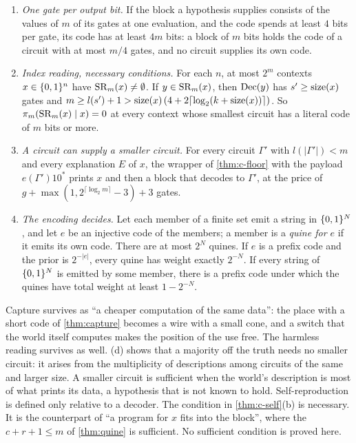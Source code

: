 \begin{proposition}\label{thm:c-self}
\begin{enumerate}[label=(\alph*),leftmargin=2em,itemsep=2pt,topsep=2pt]
\item \emph{One gate per output bit.} If the block a hypothesis supplies consists of the values of $m$ of its
gates at one evaluation, and the code spends at least $4$ bits per gate, its code has at least $4m$ bits: a
block of $m$ bits holds the code of a circuit with at most $m/4$ gates, and no circuit supplies its own code.
\item \emph{Index reading, necessary conditions.} For each $n$, at most $2^m$ contexts $x\in\{0,1\}^n$ have
$\mathrm{SR}_m(x)\ne\emptyset$. If $y\in\mathrm{SR}_m(x)$, then $\mathrm{Dec}(y)$ has $s'\ge\mathrm{size}(x)$ gates and
$m\ge l(s')+1>\mathrm{size}(x)\,(4+2\lceil\log_2(k+\mathrm{size}(x))\rceil)$. So $\pi_m(\mathrm{SR}_m(x)\mid x)=0$ at every context
whose smallest circuit has a literal code of $m$ bits or more.
\item \emph{A circuit can supply a smaller circuit.} For every circuit $\Gamma'$ with $l(|\Gamma'|)<m$ and
every explanation $E$ of $x$, the wrapper of \cref{thm:c-floor} with the payload $e(\Gamma')10^{*}$ prints $x$
and then a block that decodes to $\Gamma'$, at the price of $g+\max(1,2^{\lceil\log_2m\rceil}-3)+3$ gates.
\item \emph{The encoding decides.} Let each member of a finite set emit a string in $\{0,1\}^N$, and let $e$ be an
injective code of the members; a member is a \emph{quine for $e$} if it emits its own code. There are at most
$2^N$ quines. If $e$ is a prefix code and the prior is $2^{-|e|}$, every quine has weight exactly $2^{-N}$. If
every string of $\{0,1\}^N$ is emitted by some member, there is a prefix code under which the quines have total
weight at least $1-2^{-N}$.
\end{enumerate}
\end{proposition}

Capture survives as ``a cheaper computation of the same data'': the place with a short code of
\cref{thm:capture} becomes a wire with a small cone, and a switch that the world itself computes makes the
position of the use free. The harmless reading survives as well. (d) shows that a majority
off the truth needs no smaller circuit: it arises from the multiplicity of descriptions among circuits of the
same and larger size. A smaller circuit is sufficient when the world's description is most of what prints its
data, a hypothesis that is not known to hold. Self-reproduction is defined only relative to a decoder. The
condition in \cref{thm:c-self}(b) is necessary. It is the counterpart of ``a program for $x$ fits into the
block'', where the $c+r+1\le m$ of \cref{thm:quine} is sufficient. No sufficient condition is proved here.


